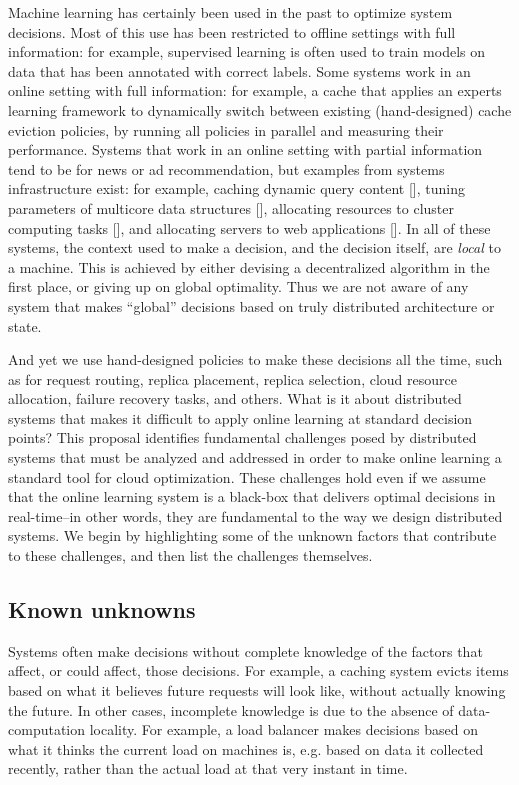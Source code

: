 \documentclass[a4paper,twocolumn]{article}
\begin{document}
Machine learning has certainly been used in the past to optimize system decisions. Most
of this use has been restricted to offline settings with full information: for example,
supervised learning is often used to train models on data that has been annotated with
correct labels. Some systems work in an online setting with full information: for example,
a cache that applies an experts learning framework to dynamically switch between existing
(hand-designed) cache eviction policies, by running all policies in parallel and measuring
their performance. Systems that work in an online setting with partial information tend to
be for news or ad recommendation, but examples from systems infrastructure exist: for example,
caching dynamic query content [], tuning parameters of multicore data structures [], allocating
resources to cluster computing tasks [], and allocating servers to web applications [].
In all of these systems, the context used to make a decision, and the
decision itself, are {\em local} to a machine. This is achieved by either devising a decentralized
algorithm in the first place, or giving up on global optimality. Thus we are not aware of any
system that makes ``global'' decisions based on truly distributed architecture or state.

And yet we use hand-designed policies to make these decisions all the time, such as for request
routing, replica placement, replica selection, cloud resource allocation, failure recovery tasks, 
and others. What is it about distributed systems that makes it difficult to apply online learning
at standard decision points? This proposal identifies fundamental challenges posed by distributed
systems that must be analyzed and addressed in order to make online learning a standard tool for
cloud optimization.  These challenges hold even if we assume that the online learning system is
a black-box that delivers optimal decisions in real-time--in other words, they are fundamental
to the way we design distributed systems.  We begin by highlighting some of the unknown factors
that contribute to these challenges, and then list the challenges themselves.

\subsection*{Known unknowns}

Systems often make decisions without complete knowledge of the factors that affect,
or could affect, those decisions.  For example, a caching system evicts items based
on what it believes future requests will look like, without actually knowing the future.
In other cases, incomplete knowledge is due to the absence of data-computation locality.
For example, a load balancer makes decisions based on what it thinks the current load on
machines is, e.g. based on data it collected recently, rather than the actual load at that
very instant in time.
\end{document}
